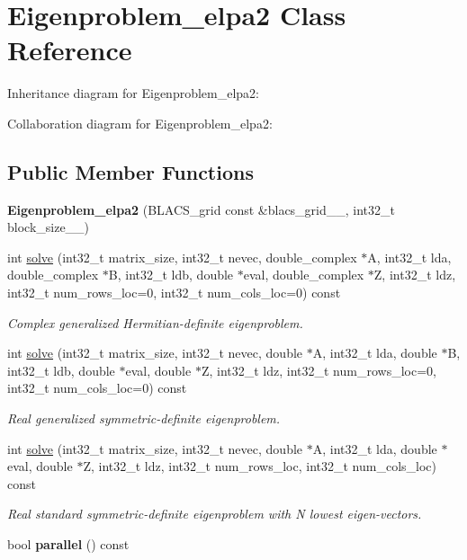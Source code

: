 \hypertarget{class_eigenproblem__elpa2}{}\section{Eigenproblem\+\_\+elpa2 Class Reference}
\label{class_eigenproblem__elpa2}


Inheritance diagram for Eigenproblem\+\_\+elpa2\+:


Collaboration diagram for Eigenproblem\+\_\+elpa2\+:
\subsection*{Public Member Functions}
\begin{DoxyCompactItemize}
\item 
\hypertarget{class_eigenproblem__elpa2_a1556a01847c0833c54c3d8f5f40558cb}{}{\bfseries Eigenproblem\+\_\+elpa2} (B\+L\+A\+C\+S\+\_\+grid const \&blacs\+\_\+grid\+\_\+\+\_\+, int32\+\_\+t block\+\_\+size\+\_\+\+\_\+)\label{class_eigenproblem__elpa2_a1556a01847c0833c54c3d8f5f40558cb}

\item 
int \hyperlink{class_eigenproblem__elpa2_a375fca97d799cb2ec978320dad5f18af}{solve} (int32\+\_\+t matrix\+\_\+size, int32\+\_\+t nevec, double\+\_\+complex $\ast$A, int32\+\_\+t lda, double\+\_\+complex $\ast$B, int32\+\_\+t ldb, double $\ast$eval, double\+\_\+complex $\ast$Z, int32\+\_\+t ldz, int32\+\_\+t num\+\_\+rows\+\_\+loc=0, int32\+\_\+t num\+\_\+cols\+\_\+loc=0) const 
\begin{DoxyCompactList}\small\item\em Complex generalized Hermitian-\/definite eigenproblem. \end{DoxyCompactList}\item 
int \hyperlink{class_eigenproblem__elpa2_a211f02ba44ca61522413ce71c90e97c5}{solve} (int32\+\_\+t matrix\+\_\+size, int32\+\_\+t nevec, double $\ast$A, int32\+\_\+t lda, double $\ast$B, int32\+\_\+t ldb, double $\ast$eval, double $\ast$Z, int32\+\_\+t ldz, int32\+\_\+t num\+\_\+rows\+\_\+loc=0, int32\+\_\+t num\+\_\+cols\+\_\+loc=0) const 
\begin{DoxyCompactList}\small\item\em Real generalized symmetric-\/definite eigenproblem. \end{DoxyCompactList}\item 
int \hyperlink{class_eigenproblem__elpa2_a667a6ff0967cad1fd5349fd9a48597e0}{solve} (int32\+\_\+t matrix\+\_\+size, int32\+\_\+t nevec, double $\ast$A, int32\+\_\+t lda, double $\ast$eval, double $\ast$Z, int32\+\_\+t ldz, int32\+\_\+t num\+\_\+rows\+\_\+loc, int32\+\_\+t num\+\_\+cols\+\_\+loc) const 
\begin{DoxyCompactList}\small\item\em Real standard symmetric-\/definite eigenproblem with N lowest eigen-\/vectors. \end{DoxyCompactList}\item 
\hypertarget{class_eigenproblem__elpa2_ae3680780752223519dae34828002a2b9}{}bool {\bfseries parallel} () const \label{class_eigenproblem__elpa2_ae3680780752223519dae34828002a2b9}


\end{DoxyCompactItemize}
